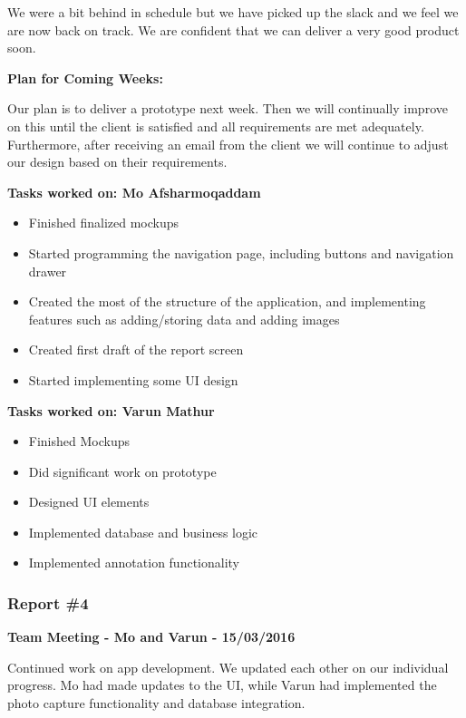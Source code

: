 \documentclass[12pt]{article}
\begin{document}
We were a bit behind in schedule but we have picked up the slack and we feel we are now back on track. We are confident that we can deliver a very good product soon. 

\par
\bigskip

\textbf{Plan for Coming Weeks:}
\par
	Our plan is to deliver a prototype next week. Then we will continually improve on this until the client is satisfied and all requirements are met adequately. Furthermore, after receiving an email from the client we will continue to adjust our design based on their requirements. 
\par
\bigskip
	
\textbf{Tasks worked on: Mo Afsharmoqaddam}
\begin{itemize}
\item Finished finalized mockups
\item Started programming the navigation page, including buttons and navigation drawer
\item Created the most of the structure of the application, and implementing features such as adding/storing data and adding images
\item Created first draft of the report screen
\item Started implementing some UI design
\end{itemize}
\bigskip

\textbf{Tasks worked on: Varun Mathur}
\begin{itemize}
\item Finished Mockups
\item Did significant work on prototype
\item Designed UI elements
\item Implemented database and business logic
\item Implemented annotation functionality
\end{itemize}

\subsubsection{Report \#4}
\textbf{Team Meeting - Mo and Varun - 15/03/2016}
\par
	Continued work on app development. We updated each other on our individual progress. Mo had made updates to the UI, while Varun had implemented the photo capture functionality and database integration.
\par
\bigskip
	
\end{document}
